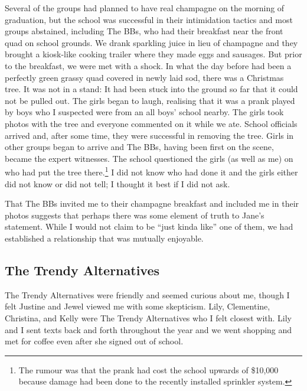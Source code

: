 Several of the groups had planned to have real champagne on the morning of graduation, but the school was successful in their intimidation tactics and most groups abstained, including The BBs, who had their breakfast near the front quad on school grounds. We drank sparkling juice in lieu of champagne and they brought a kiosk-like cooking trailer where they made eggs and sausages. But prior to the breakfast, we were met with a shock. In what the day before had been a perfectly green grassy quad covered in newly laid sod, there was a Christmas tree. It was not in a stand: It had been stuck into the ground so far that it could not be pulled out. The girls began to laugh, realising that it was a prank played by boys who I suspected were from an all boys' school nearby. The girls took photos with the tree and everyone commented on it while we ate. School officials arrived and, after some time, they were successful in removing the tree. Girls in other groups began to arrive and The BBs, having been first on the scene, became the expert witnesses. The school questioned the girls (as well as me) on who had put the tree there.\footnote{The rumour was that the prank had cost the school upwards of \$10,000 because damage had been done to the recently installed sprinkler system.}  I did not know who had done it and the girls either did not know or did not tell; I thought it best if I did not ask.

That The BBs invited me to their champagne breakfast and included me in their photos suggests that perhaps there was some element of truth to Jane's statement. While I would not claim to be ``just kinda like'' one of them, we had established a relationship that was mutually enjoyable.

\subsection{The Trendy Alternatives}
\largerpage
The Trendy Alternatives were friendly and seemed curious about me, though I felt Justine and Jewel viewed me with some skepticism. Lily, Clementine, Christina, and Kelly were The Trendy Alternatives who I felt closest with. Lily and I sent texts back and forth throughout the year and we went shopping and met for coffee even after she signed out of school.   

